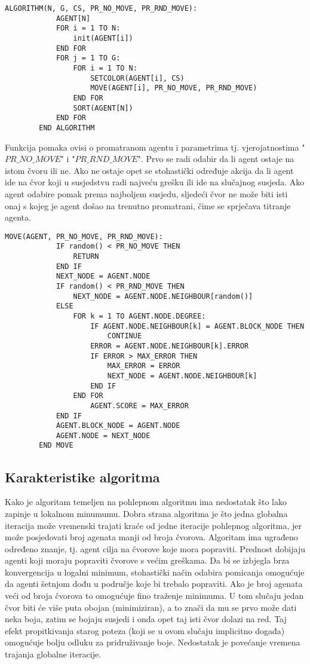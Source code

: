 \documentclass[times, utf8, diplomski, numeric]{fer}
\begin{document}
\begin{singlespace}
	\begin{lstlisting}[caption=Pseudok\^{o}d agentskog algoritma]
		ALGORITHM(N, G, CS, PR_NO_MOVE, PR_RND_MOVE):
			AGENT[N]
			FOR i = 1 TO N:
				init(AGENT[i])
			END FOR
			FOR j = 1 TO G:
				FOR i = 1 TO N:
					SETCOLOR(AGENT[i], CS)
					MOVE(AGENT[i], PR_NO_MOVE, PR_RND_MOVE)
				END FOR
				SORT(AGENT[N])
			END FOR
		END ALGORITHM
	\end{lstlisting}
\end{singlespace}

Funkcija pomaka ovisi o promatranom agentu i parametrima tj. vjerojatnostima "$PR\_NO\_MOVE$" i "$PR\_RND\_MOVE$". Prvo se radi odabir da li agent ostaje na istom čvoru ili ne. Ako ne ostaje opet se stohastički određuje akcija da li agent ide na čvor koji u susjedstvu radi najveću grešku ili ide na slučajnog susjeda. Ako agent odabire pomak prema najboljem susjedu, sljedeći čvor ne može biti isti onaj s kojeg je agent došao na trenutno promatrani, čime se sprječava titranje agenta.

\begin{singlespace}
	\begin{lstlisting}[caption=Detalji funkcije pomaka - MOVE]
		MOVE(AGENT, PR_NO_MOVE, PR_RND_MOVE):
			IF random() < PR_NO_MOVE THEN
				RETURN
			END IF
			NEXT_NODE = AGENT.NODE
			IF random() < PR_RND_MOVE THEN
				NEXT_NODE = AGENT.NODE.NEIGHBOUR[random()]
			ELSE
				FOR k = 1 TO AGENT.NODE.DEGREE:
					IF AGENT.NODE.NEIGHBOUR[k] = AGENT.BLOCK_NODE THEN
						CONTINUE
					ERROR = AGENT.NODE.NEIGHBOUR[k].ERROR
					IF ERROR > MAX_ERROR THEN
						MAX_ERROR = ERROR
						NEXT_NODE = AGENT.NODE.NEIGHBOUR[k]
					END IF
				END FOR
					AGENT.SCORE = MAX_ERROR
			END IF
			AGENT.BLOCK_NODE = AGENT.NODE
			AGENT.NODE = NEXT_NODE
		END MOVE
	\end{lstlisting}
\end{singlespace}

\subsection{Karakteristike algoritma}

Kako je algoritam temeljen na pohlepnom algoritmu ima nedostatak što lako zapinje u lokalnom minumumu. Dobra strana algoritma je što jedna globalna iteracija može vremenski trajati kraće od jedne iteracije pohlepnog algoritma, jer može posjedovati broj agenata manji od broja čvorova. Algoritam ima ugrađeno određeno znanje, tj. agent cilja na čvorove koje mora popraviti. Prednost dobijaju agenti koji moraju popraviti čvorove s većim greškama. Da bi se izbjegla brza konvergencija u logalni minimum, stohastički način odabira pomicanja omogućuje da agenti šetnjom dođu u područje koje bi trebalo popraviti. Ako je broj agenata veći od broja čvorova to omogućuje fino traženje minimuma. U tom slučaju jedan čvor biti će više puta obojan (minimiziran), a to znači da mu se prvo može dati neka boja, zatim se bojaju susjedi i onda opet taj isti čvor dolazi na red. Taj efekt propitkivanja starog poteza (koji se u ovom slučaju implicitno događa) omogućuje bolju odluku za pridruživanje boje. Nedostatak je povećanje vremena trajanja globalne iteracije.
\end{document}
